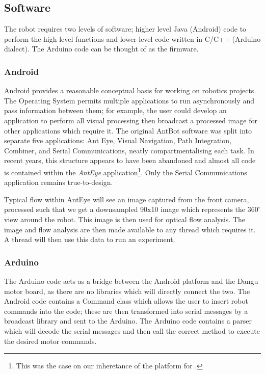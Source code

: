 \documentclass[a4paper,11pt,twoside,openright]{article}
\begin{document}
\subsection{ Software }
The robot requires two levels of software; higher level Java (Android) code to
perform the high level functions and lower level code written in C/C++
(Arduino dialect). The Arduino code can be thought of as the firmware.

\subsubsection{ Android } \label{subsubsec:droid}
Android provides a reasonable conceptual basis for working on robotics
projects. The Operating System permits multiple applications to run
asynchronously and pass information between them; for example, the
user could develop an application to perform all visual processing
then broadcast a processed image for other applications which require
it. The original AntBot software was split into separate five
applications: Ant Eye, Visual Navigation, Path Integration, Combiner,
and Serial Communications, neatly compartmentalising each task.  In
recent years, this structure appears to have been abandoned and almost
all code is contained within the \textit{AntEye}
application\footnote{This was the case on our inheretance of the
  platform for \cite{Mitchell2018}.}. Only the Serial Communications
application remains true-to-design.
\newline
\par

Typical flow within AntEye will see an image captured from the front camera,
processed such that we get a downsampled 90x10 image which represents the
$360^{\circ}$ view around the robot. This image is then used for optical
flow analysis. The image and flow analysis are then made available to any thread
which requires it. A thread will then use this data to run an experiment.

\subsubsection{ Arduino }
The Arduino code acts as a bridge between the Android platform and the Dangu
motor board, as there are no libraries which will directly connect the two.
The Android code contains a Command class which allows the user to insert robot
commands into the code; these are then transformed into serial messages by a
broadcast library \cite{Eberding2016} and sent to the Arduino. The Arduino code
contains a parser which will decode the serial messages and then call the
correct method to execute the desired motor commands.
\end{document}
